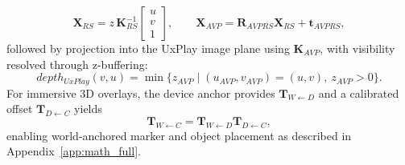 \[
\mathbf{X}_{RS} = z\,\mathbf{K}_{RS}^{-1}
\begin{bmatrix}
u \\ v \\ 1
\end{bmatrix},
\qquad
\mathbf{X}_{AVP} = \mathbf{R}_{AVPRS}\mathbf{X}_{RS} + \mathbf{t}_{AVPRS},
\]
followed by projection into the UxPlay image plane using $\mathbf{K}_{AVP}$, with visibility resolved through z-buffering:
\[
depth_{UxPlay}(v,u) = \min\{ z_{AVP} \mid (u_{AVP},v_{AVP})=(u,v),\ z_{AVP}>0 \}.
\]
For immersive 3D overlays, the device anchor provides $\mathbf{T}_{W \leftarrow D}$ and a calibrated offset $\mathbf{T}_{D \leftarrow C}$ yields
\[
\mathbf{T}_{W \leftarrow C} = \mathbf{T}_{W \leftarrow D}\mathbf{T}_{D \leftarrow C},
\]
enabling world-anchored marker and object placement as described in Appendix~\ref{app:math_full}.
